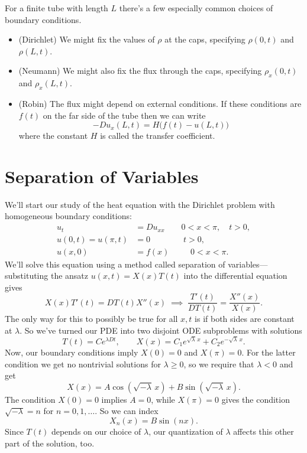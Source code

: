 \documentclass[../m180main.tex]{subfiles}
\begin{document}
For a finite tube with length $L$ there's a few especially common choices of boundary conditions.
\begin{itemize}[topsep=0pt]
    \item (Dirichlet) We might fix the values of $\rho$ at the caps, specifying $\rho(0,t)$ and $\rho(L,t)$. 
    \item (Neumann) We might also fix the flux through the caps, specifying $\rho_x(0,t)$ and $\rho_x(L,t)$.
    \item (Robin) The flux might depend on external conditions.
    If these conditions are $f(t)$ on the far side of the tube then we can write
    \[ -D u_x(L,t) = H \big( f(t) - u(L,t) \big) \]
    where the constant $H$ is called the transfer coefficient.
\end{itemize}

\section{Separation of Variables}
We'll start our study of the heat equation with the Dirichlet problem with homogeneous boundary conditions:
\begin{align*}
    u_t &= Du_{xx} \qquad 0 < x < \pi, \quad t > 0, \\
    u(0,t) = u(\pi, t) &= 0 \qquad\qquad t > 0, \\
    u(x,0) &= f(x) \qquad\;\; 0 < x < \pi.
\end{align*}
We'll solve this equation using a method called separation of variables---substituting the ansatz $u(x,t) = X(x) T(t)$ into the differential equation gives
\[ X(x) T'(t) = D T(t) X''(x) \;\implies\; \frac{T'(t)}{DT(t)} = \frac{X''(x)}{X(x)}. \]
The only way for this to possibly be true for all $x,t$ is if both sides are constant at $\lambda$.
So we've turned our PDE into two disjoint ODE subproblems with solutions
\[ T(t) = C e^{\lambda D t}, \qquad X(x) = C_1 e^{\sqrt{\lambda} \,x} + C_2 e^{-\sqrt{\lambda} \,x}. \]
Now, our boundary conditions imply $X(0) = 0$ and $X(\pi) = 0$.
For the latter condition we get no nontrivial solutions for $\lambda \geq 0$, so we require that $\lambda < 0$ and get
\[ X(x) = A \cos \left( \sqrt{-\lambda} \,x \right) + B \sin \left( \sqrt{-\lambda} \,x \right). \]
The condition $X(0) = 0$ implies $A = 0$, while $X(\pi) = 0$ gives the condition $\sqrt{-\lambda} = n$ for $n = 0, 1, \ldots$.
So we can index
\[ X_n(x) = B \sin (nx). \]
Since $T(t)$ depends on our choice of $\lambda$, our quantization of $\lambda$ affects this other part of the solution, too.
\end{document}
